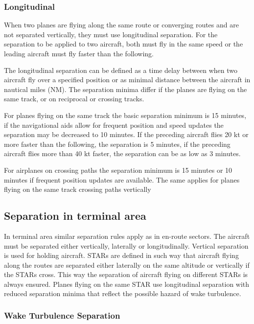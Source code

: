 \subsubsection{Longitudinal}

When two planes are flying along the same route or converging routes and are not separated vertically, they must use longitudinal separation. For the separation to be applied to two aircraft, both must fly in the same speed or the leading aircraft must fly faster than the following.

The longitudinal separation can be defined as a time delay between when two aircraft fly over a specified position or as minimal distance between the aircraft in nautical miles (NM). The separation minima differ if the planes are flying on the same track, or on reciprocal or crossing tracks.

For planes flying on the same track the basic separation minimum is 15 minutes, if the navigational aids allow for frequent position and speed updates the separation may be decreased to 10 minutes. If the preceding aircraft flies 20 kt or more faster than the following, the separation is 5 minutes, if the preceding aircraft flies more than 40 kt faster, the separation can be as low as 3 minutes. \cite[Chapter 5]{doc4444}

For airplanes on crossing paths the separation minimum is 15 minutes or 10 minutes if frequent position updates are available. The same applies for planes flying on the same track crossing paths vertically

\subsection{Separation in terminal area}

In terminal area similar separation rules apply as in en-route sectors. The aircraft must be separated either vertically, laterally or longitudinally. Vertical separation is used for holding aircraft. STARs are defined in such way that aircraft flying along the routes are separated either laterally on the same altitude or vertically if the STARs cross. This way the separation of aircraft flying on different STARs is always ensured. Planes flying on the same STAR use longitudinal separation with reduced separation minima that reflect the possible hazard of wake turbulence.

\subsubsection{Wake Turbulence Separation}

